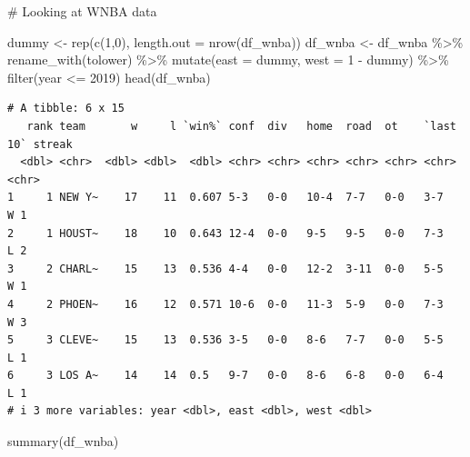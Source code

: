 \documentclass[
  letterpaper,
  DIV=11,
  numbers=noendperiod]{scrartcl}
\newenvironment{Shaded}{\begin{snugshade}}{\end{snugshade}}
\newcommand{\AttributeTok}[1]{\textcolor[rgb]{0.40,0.45,0.13}{#1}}
\newcommand{\CommentTok}[1]{\textcolor[rgb]{0.37,0.37,0.37}{#1}}
\newcommand{\DecValTok}[1]{\textcolor[rgb]{0.68,0.00,0.00}{#1}}
\newcommand{\FunctionTok}[1]{\textcolor[rgb]{0.28,0.35,0.67}{#1}}
\newcommand{\NormalTok}[1]{\textcolor[rgb]{0.00,0.23,0.31}{#1}}
\newcommand{\OtherTok}[1]{\textcolor[rgb]{0.00,0.23,0.31}{#1}}
\newcommand{\SpecialCharTok}[1]{\textcolor[rgb]{0.37,0.37,0.37}{#1}}
\begin{document}
\begin{Shaded}
\begin{Highlighting}[]
\CommentTok{\# Looking at WNBA data}

\NormalTok{dummy }\OtherTok{\textless{}{-}} \FunctionTok{rep}\NormalTok{(}\FunctionTok{c}\NormalTok{(}\DecValTok{1}\NormalTok{,}\DecValTok{0}\NormalTok{), }\AttributeTok{length.out =} \FunctionTok{nrow}\NormalTok{(df\_wnba))}
\NormalTok{df\_wnba }\OtherTok{\textless{}{-}}\NormalTok{ df\_wnba }\SpecialCharTok{\%\textgreater{}\%}
  \FunctionTok{rename\_with}\NormalTok{(tolower) }\SpecialCharTok{\%\textgreater{}\%}
  \FunctionTok{mutate}\NormalTok{(}\AttributeTok{east =}\NormalTok{ dummy,}
         \AttributeTok{west =} \DecValTok{1} \SpecialCharTok{{-}}\NormalTok{ dummy) }\SpecialCharTok{\%\textgreater{}\%}
  \FunctionTok{filter}\NormalTok{(year }\SpecialCharTok{\textless{}=} \DecValTok{2019}\NormalTok{)}
\FunctionTok{head}\NormalTok{(df\_wnba)}
\end{Highlighting}
\end{Shaded}

\begin{verbatim}
# A tibble: 6 x 15
   rank team       w     l `win%` conf  div   home  road  ot    `last 10` streak
  <dbl> <chr>  <dbl> <dbl>  <dbl> <chr> <chr> <chr> <chr> <chr> <chr>     <chr> 
1     1 NEW Y~    17    11  0.607 5-3   0-0   10-4  7-7   0-0   3-7       W 1   
2     1 HOUST~    18    10  0.643 12-4  0-0   9-5   9-5   0-0   7-3       L 2   
3     2 CHARL~    15    13  0.536 4-4   0-0   12-2  3-11  0-0   5-5       W 1   
4     2 PHOEN~    16    12  0.571 10-6  0-0   11-3  5-9   0-0   7-3       W 3   
5     3 CLEVE~    15    13  0.536 3-5   0-0   8-6   7-7   0-0   5-5       L 1   
6     3 LOS A~    14    14  0.5   9-7   0-0   8-6   6-8   0-0   6-4       L 1   
# i 3 more variables: year <dbl>, east <dbl>, west <dbl>
\end{verbatim}

\begin{Shaded}
\begin{Highlighting}[]
\FunctionTok{summary}\NormalTok{(df\_wnba)}
\end{Highlighting}
\end{Shaded}
\end{document}
